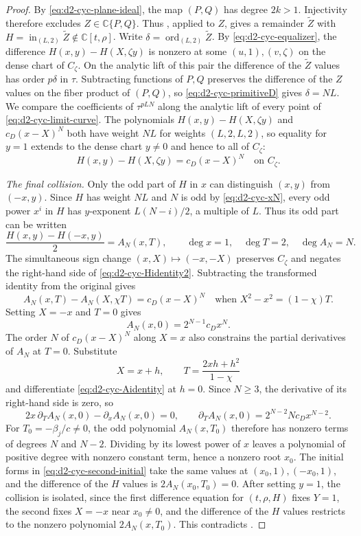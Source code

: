 \documentclass[11pt,letterpaper]{article}
\numberwithin{equation}{section}
\theoremstyle{remark}
\theoremstyle{plain}
\newcommand{\C}{\mathbb{C}}
\newcommand{\ord}{\operatorname{ord}}
\begin{document}
\begin{proof}
By \eqref{eq:d2-cyc-plane-ideal}, the map $(P,Q)$ has degree $2k>1$.
Injectivity therefore excludes $Z\in\C\{P,Q\}$.
Thus , applied to $Z$, gives a remainder
$\widetilde Z$ with
$H=\operatorname{in}_{(L,2)}\widetilde Z\notin\C[t,\rho]$.
Write $\delta=\ord_{(L,2)}\widetilde Z$.
By \eqref{eq:d2-cyc-equalizer}, the difference $H(x,y)-H(X,\zeta y)$
is nonzero at some $(u,1),(v,\zeta)$ on the dense chart of $C_\zeta$.
On the analytic lift of this pair the difference of the $\widetilde Z$
values has order $p\delta$ in $\tau$.  Subtracting functions of $P,Q$
preserves the difference of the $Z$ values on the fiber product of $(P,Q)$, so
\eqref{eq:d2-cyc-primitiveD} gives $\delta=NL$.
We compare the coefficients of $\tau^{pLN}$ along the analytic
lift of every point of \eqref{eq:d2-cyc-limit-curve}.
The polynomials $H(x,y)-H(X,\zeta y)$ and $c_D(x-X)^N$ both have
weight $NL$ for weights $(L,2,L,2)$, so equality for $y=1$ extends to
the dense chart $y\neq0$ and hence to all of $C_\zeta$:
\begin{equation}
 H(x,y)-H(X,\zeta y)=c_D(x-X)^N\quad\text{on }C_\zeta.             \label{eq:d2-cyc-Hidentity2}
\end{equation}

\smallskip
\noindent\emph{The final collision.}
Only the odd part of $H$ in $x$ can distinguish $(x,y)$ from $(-x,y)$.
Since $H$ has weight $NL$ and $N$ is odd by
\eqref{eq:d2-cyc-xN}, every odd power $x^i$
in $H$ has $y$-exponent $L(N-i)/2$, a multiple of $L$.
Thus its odd part can be written
\[
 \frac{H(x,y)-H(-x,y)}2=A_N(x,T),
 \qquad \deg x=1,\quad\deg T=2,\quad\deg A_N=N.
\]
The simultaneous sign change $(x,X)\mapsto(-x,-X)$ preserves
$C_\zeta$ and negates the right-hand side of
\eqref{eq:d2-cyc-Hidentity2}.  Subtracting the transformed identity
from the original gives
\begin{equation}
 A_N(x,T)-A_N(X,\chi T)=c_D(x-X)^N
 \quad\text{when }X^2-x^2=(1-\chi)T.
 \label{eq:d2-cyc-Aidentity}
\end{equation}
Setting $X=-x$ and $T=0$ gives
\[
 A_N(x,0)=2^{N-1}c_Dx^N.
\]
The order $N$ of $c_D(x-X)^N$ along $X=x$ also constrains the partial
derivatives of $A_N$ at $T=0$.  Substitute
\[
 X=x+h,\qquad T=\frac{2xh+h^2}{1-\chi}
\]
and differentiate \eqref{eq:d2-cyc-Aidentity} at $h=0$.
Since $N\geq3$, the derivative of its right-hand side is zero, so
\[
 2x\,\partial_TA_N(x,0)-\partial_xA_N(x,0)=0,
 \qquad
 \partial_TA_N(x,0)=2^{N-2}Nc_Dx^{N-2}.
\]
For $T_0=-\beta_j/c\neq0$, the odd polynomial $A_N(x,T_0)$
therefore has nonzero terms of degrees $N$ and $N-2$.  Dividing by its
lowest power of $x$ leaves a polynomial of positive degree with nonzero
constant term, hence a nonzero root $x_0$.
The initial forms in \eqref{eq:d2-cyc-second-initial} take the same values
at $(x_0,1),(-x_0,1)$, and the difference of the $H$ values
is $2A_N(x_0,T_0)=0$.
After setting $y=1$, the collision is isolated, since the first difference
equation for $(t,\rho,H)$ fixes $Y=1$, the second fixes $X=-x$ near $x_0\neq0$,
and the difference of the $H$ values restricts to the nonzero polynomial
$2A_N(x,T_0)$.
This contradicts .
\end{proof}
\end{document}
